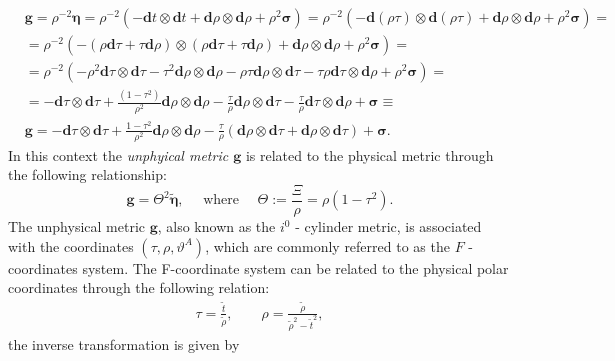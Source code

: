 \begin{align}\label{eq:unphysicalmetricMink}
  & \boldsymbol{g} = \rho^{-2} \boldsymbol{\eta} = \rho^{-2}(-\mathbf{d} t \otimes \mathbf{d} t + \mathbf{d} \rho \otimes \mathbf{d} \rho + \rho^2 \boldsymbol{\sigma}) = \rho^{-2}(-\mathbf{d}(\rho \tau)  \otimes \mathbf{d}(\rho \tau)  + \mathbf{d} \rho \otimes \mathbf{d} \rho + \rho^2 \boldsymbol{\sigma}) = \nonumber \\
  & = \rho^{-2}(-(\rho \mathbf{d}\tau + \tau \mathbf{d}\rho)\otimes(\rho \mathbf{d}\tau + \tau \mathbf{d}\rho) + \mathbf{d} \rho \otimes \mathbf{d} \rho + \rho^2 \boldsymbol{\sigma}) = \nonumber \\
  & = \rho^{-2}(-\rho^{2}\mathbf{d} \tau \otimes \mathbf{d} \tau - \tau^{2}\mathbf{d} \rho \otimes \mathbf{d} \rho - \rho\tau \mathbf{d} \rho \otimes \mathbf{d} \tau - \tau\rho \mathbf{d} \tau \otimes \mathbf{d} \rho + \rho^2 \boldsymbol{\sigma}) = \nonumber \\
  & = -\mathbf{d} \tau \otimes \mathbf{d} \tau+\frac{\left(1-\tau^2\right)}{\rho^2} \mathbf{d} \rho \otimes \mathbf{d} \rho-\frac{\tau}{\rho} \mathbf{d} \rho \otimes \mathbf{d} \tau-\frac{\tau}{\rho} \mathbf{d} \tau \otimes \mathbf{d} \rho+\boldsymbol{\sigma} \equiv \nonumber \\
  & \boldsymbol{g} = -\mathbf{d} \tau \otimes \mathbf{d} \tau + \frac{1 - \tau^2}{\rho^2} \mathbf{d} \rho \otimes \mathbf{d} \rho -\frac{\tau}{\rho} \left(\mathbf{d} \rho \otimes \mathbf{d} \tau + \mathbf{d} \rho \otimes \mathbf{d} \tau\right) + \boldsymbol{\sigma}.
\end{align}
In this context the \textit{unphyical metric $\boldsymbol{g}$} is related to the physical metric through the following relationship:
\begin{equation}\label{eq:gandtheta}
\boldsymbol{g}=\Theta^2 \tilde{\boldsymbol{\eta}}, \quad \text { where } \quad \Theta:=\frac{\Xi}{\rho}=\rho\left(1-\tau^2\right).
\end{equation}
The unphysical metric $\boldsymbol{g}$, also known as the $i^0$ - cylinder metric, is associated with the coordinates $(\tau, \rho, \vartheta^A)$, which are commonly referred to as the $F$ - coordinates system.
The F-coordinate system can be related to the physical polar coordinates through the following relation:
\begin{align}\label{Ftophys}
\tau = \frac{\tilde{t}}{\tilde{\rho}}, \qquad \rho = \frac{\tilde{\rho}}{\tilde{\rho}^2-\tilde{t}^2},
\end{align}
the inverse transformation is given by
